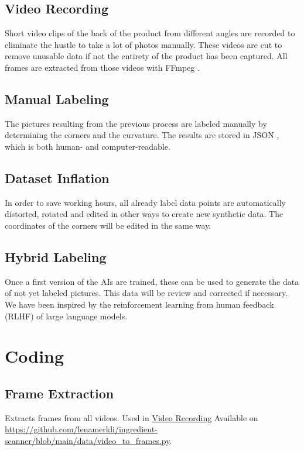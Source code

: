 \documentclass[a4paper,11pt]{report}
\begin{document}
            \subsection{Video Recording}
                \label{subsec:data:recording}
                Short video clips of the back of the product from different angles are recorded to eliminate the hustle to take a lot of photos manually. These videos are cut to remove unusable data if not the entirety of the product has been captured. All frames are extracted from those videos with FFmpeg \cite{ffmpeg} \cite{ffmpeg-python}.

            \subsection{Manual Labeling}
                The pictures resulting from the previous process are labeled manually by determining the corners and the curvature. The results are stored in JSON \cite{json}, which is both human- and computer-readable.

            \subsection{Dataset Inflation}
                \label{subsec:data:inflation}
                In order to save working hours, all already label data points are automatically distorted, rotated and edited in other ways to create new synthetic data. The coordinates of the corners will be edited in the same way.

            \subsection{Hybrid Labeling}
                Once a first version of the AIs are trained, these can be used to generate the data of not yet labeled pictures. This data will be review and corrected if necessary. We have been inspired by the reinforcement learning from human feedback (RLHF) \cite{rlhf1} \cite{rlhf2}  of large language models.

        \section{Coding}

            \subsection{Frame Extraction}
                Extracts frames from all videos. Used in \hyperref[subsec:data:recording]{Video Recording} Available on \url{https://github.com/lenamerkli/ingredient-scanner/blob/main/data/video_to_frames.py}.
\end{document}
